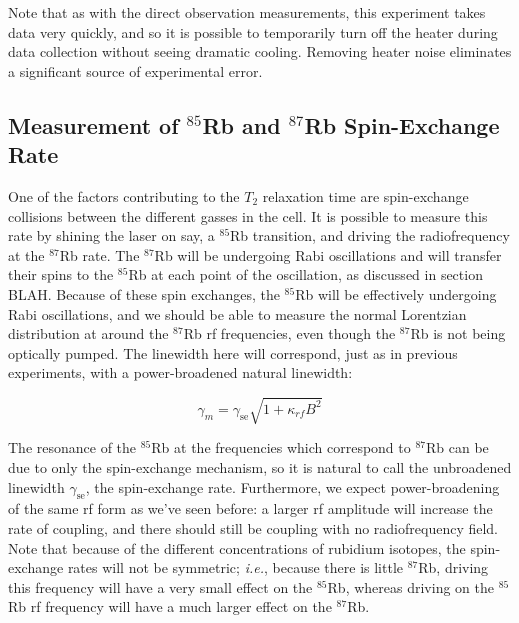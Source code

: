 Note that as with the direct observation measurements, this experiment takes data very quickly, and so it is possible to temporarily turn off the heater during data collection without seeing dramatic cooling. Removing heater noise eliminates a significant source of experimental error.

\subsection{Measurement of $^{85}$Rb and $^{87}$Rb Spin-Exchange Rate}

One of the factors contributing to the $T_{2}$ relaxation time are spin-exchange collisions between the different gasses in the cell. It is possible to measure this rate by shining the laser on say, a $^{85}$Rb transition, and driving the radiofrequency at the $^{87}$Rb rate. The $^{87}$Rb will be undergoing Rabi oscillations and will transfer their spins to the $^{85}$Rb at each point of the oscillation, as discussed in section BLAH. Because of these spin exchanges, the $^{85}$Rb will be effectively undergoing Rabi oscillations, and we should be able to measure the normal Lorentzian distribution at around the $^{87}$Rb rf frequencies, even though the $^{87}$Rb is not being optically pumped. The linewidth here will correspond, just as in previous experiments, with a power-broadened natural linewidth:

\begin{equation}
\gamma_{m} = \gamma_{\mathrm{se}} \sqrt{1+\kappa_{rf} B^{2}} \label{eq:sebroad}
\end{equation}

The resonance of the $^{85}$Rb at the frequencies which correspond to $^{87}$Rb can be due to only the spin-exchange mechanism, so it is natural to call the unbroadened linewidth $\gamma_{\mathrm{se}}$, the spin-exchange rate. Furthermore, we expect power-broadening of the same rf form as we've seen before: a larger rf amplitude will increase the rate of coupling, and there should still be coupling with no radiofrequency field. Note that because of the different concentrations of rubidium isotopes, the spin-exchange rates will not be symmetric; \emph{i.e.}, because there is little  $^{87}$Rb, driving this frequency will have a very small effect on the $^{85}$Rb, whereas driving on the  $^{85}$Rb rf frequency will have a much larger effect on the  $^{87}$Rb.

